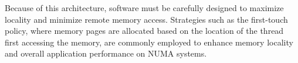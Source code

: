 Because of this architecture, software must be carefully designed to maximize locality and minimize remote memory access. Strategies such as the first-touch policy, where memory pages are allocated based on the location of the thread first accessing the memory, are commonly employed to enhance memory locality and overall application performance on NUMA systems.
